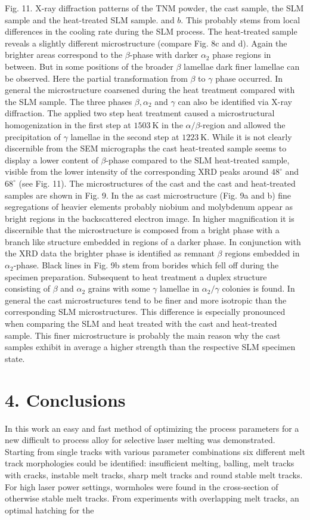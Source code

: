 \documentclass[10pt]{article}
\begin{document}
Fig. 11. X-ray diffraction patterns of the TNM powder, the cast sample, the SLM sample and the heat-treated SLM sample. and $b$. This probably stems from local differences in the cooling rate during the SLM process. The heat-treated sample reveals a slightly different microstructure (compare Fig. $8 \mathrm{c}$ and d). Again the brighter areas correspond to the $\beta$-phase with darker $\alpha_{2}$ phase regions in between. But in some positions of the broader $\beta$ lamellae dark finer lamellae can be observed. Here the partial transformation from $\beta$ to $\gamma$ phase occurred. In general the microstructure coarsened during the heat treatment compared with the SLM sample. The three phases $\beta, \alpha_{2}$ and $\gamma$ can also be identified via X-ray diffraction. The applied two step heat treatment caused a microstructural homogenization in the first step at $1503 \mathrm{~K}$ in the $\alpha / \beta$-region and allowed the precipitation of $\gamma$ lamellae in the second step at $1223 \mathrm{~K}$. While it is not clearly discernible from the SEM micrographs the cast heat-treated sample seems to display a lower content of $\beta$-phase compared to the SLM heat-treated sample, visible from the lower intensity of the corresponding XRD peaks around $48^{\circ}$ and $68^{\circ}$ (see Fig. 11). The microstructures of the cast and the cast and heat-treated samples are shown in Fig. 9. In the as cast microstructure (Fig. 9a and b) fine segregations of heavier elements probably niobium and molybdenum appear as bright regions in the backscattered electron image. In higher magnification it is discernible that the microstructure is composed from a bright phase with a branch like structure embedded in regions of a darker phase. In conjunction with the XRD data the brighter phase is identified as remnant $\beta$ regions embedded in $\alpha_{2}$-phase. Black lines in Fig. 9b stem from borides which fell off during the specimen preparation. Subsequent to heat treatment a duplex structure consisting of $\beta$ and $\alpha_{2}$ grains with some $\gamma$ lamellae in $\alpha_{2} / \gamma$ colonies is found. In general the cast microstructures tend to be finer and more isotropic than the corresponding SLM microstructures. This difference is especially pronounced when comparing the SLM and heat treated with the cast and heat-treated sample. This finer microstructure is probably the main reason why the cast samples exhibit in average a higher strength than the respective SLM specimen state.

\section*{4. Conclusions}
In this work an easy and fast method of optimizing the process parameters for a new difficult to process alloy for selective laser melting was demonstrated. Starting from single tracks with various parameter combinations six different melt track morphologies could be identified: insufficient melting, balling, melt tracks with cracks, instable melt tracks, sharp melt tracks and round stable melt tracks. For high laser power settings, wormholes were found in the cross-section of otherwise stable melt tracks. From experiments with overlapping melt tracks, an optimal hatching for the
\end{document}
